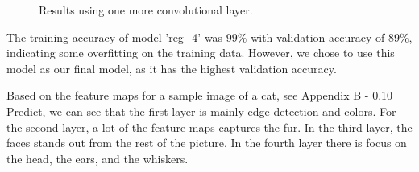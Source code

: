 \begin{figure}[H]
    \vspace*{-0.7cm}
    \centering
    \hspace{1cm}
    \caption{Results using one more convolutional layer.}
    \label{fig:reg}
    \vspace*{-0.7cm}
\end{figure}

The training accuracy of model 'reg\_4' was $99\%$ with validation accuracy of $89\%$, indicating some overfitting on the training data. However, we chose to use this model as our final model, as it has the highest validation accuracy.

Based on the feature maps for a sample image of a cat, see Appendix B - 0.10 Predict, we can see that the first layer is mainly edge detection and colors. For the second layer, a lot of the feature maps captures the fur. In the third layer, the faces stands out from the rest of the picture. In the fourth layer there is focus on the head, the ears, and the whiskers.